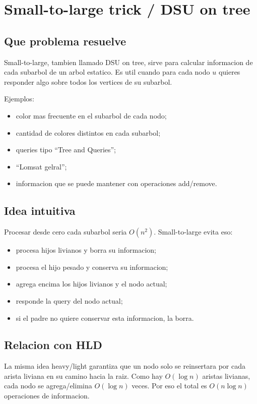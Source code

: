 \documentclass[10pt]{article}
\newcommand{\bigO}{O}
\begin{document}
\newpage
\section{Small-to-large trick / DSU on tree}

\subsection{Que problema resuelve}
Small-to-large, tambien llamado DSU on tree, sirve para calcular informacion de
cada subarbol de un arbol estatico. Es util cuando para cada nodo $u$ quieres
responder algo sobre todos los vertices de su subarbol.

Ejemplos:
\begin{itemize}[leftmargin=*]
\item color mas frecuente en el subarbol de cada nodo;
\item cantidad de colores distintos en cada subarbol;
\item queries tipo ``Tree and Queries'';
\item ``Lomsat gelral'';
\item informacion que se puede mantener con operaciones add/remove.
\end{itemize}

\subsection{Idea intuitiva}
Procesar desde cero cada subarbol seria $\bigO(n^2)$. Small-to-large evita eso:
\begin{itemize}[leftmargin=*]
\item procesa hijos livianos y borra su informacion;
\item procesa el hijo pesado y conserva su informacion;
\item agrega encima los hijos livianos y el nodo actual;
\item responde la query del nodo actual;
\item si el padre no quiere conservar esta informacion, la borra.
\end{itemize}

\subsection{Relacion con HLD}
La misma idea heavy/light garantiza que un nodo solo se reinsertara por cada
arista liviana en su camino hacia la raiz. Como hay $\bigO(\log n)$ aristas
livianas, cada nodo se agrega/elimina $\bigO(\log n)$ veces. Por eso el total es
$\bigO(n\log n)$ operaciones de informacion.
\end{document}
